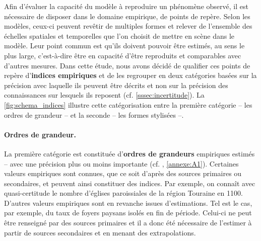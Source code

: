 Afin d'évaluer la capacité du modèle à reproduire un phénomène observé, il est nécessaire de disposer dans le domaine empirique, de \og points de repère\fg{}.
Selon les modèles, ceux-ci peuvent revêtir de multiples formes et relever de l'ensemble des échelles spatiales et temporelles que l'on choisit de mettre en scène dans le modèle.
Leur point commun est qu'ils doivent pouvoir être estimés, au sens le plus large, c'est-à-dire être en capacité d'être reproduits et comparables avec d'autres mesures.
Dans cette étude, nous avons décidé de qualifier ces points de repère d'\og\textbf{indices empiriques}\fg{} et de les regrouper en deux catégories basées sur la précision avec laquelle ils peuvent être décrits et non sur la précision des connaissances sur lesquels ils reposent (cf. \cref{sssec:incertitude}).
La \cref{fig:schema_indices} illustre cette catégorisation entre la première catégorie -- les ordres de grandeur -- et la seconde -- les formes stylisées --.

\paragraph{Ordres de grandeur.}
La première catégorie est constituée d'\textbf{ordres de grandeurs} empiriques estimés -- avec une précision plus ou moins importante (cf. , \cref{annexe:A1}).
Certaines valeurs empiriques sont connues, que ce soit d'après des sources primaires ou secondaires, et peuvent ainsi constituer des indices.
Par exemple, on connaît avec quasi-certitude le nombre d'églises paroissiales de la région Touraine en 1100.
D'autres valeurs empiriques sont en revanche issues d'estimations.
Tel est le cas, par exemple, du taux de foyers paysans isolés en fin de période.
Celui-ci ne peut être renseigné par des sources primaires et il a donc été nécessaire de l'estimer à partir de sources secondaires et en menant des extrapolations.

